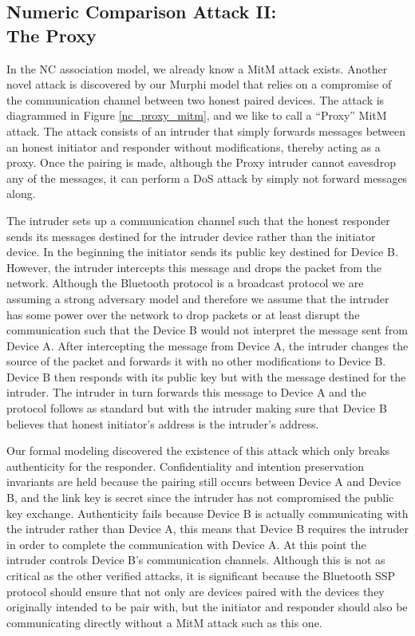 \documentclass{acm_proc_article-sp}
\begin{document}
\subsection{Numeric Comparison Attack II:\\The Proxy}
In the NC association model, we already know a MitM attack exists. Another novel attack is discovered by our Murphi model that relies on a compromise of the communication channel between two honest paired devices. The attack is diagrammed in Figure \ref{nc_proxy_mitm}, and we like to call a ``Proxy'' MitM attack. The attack consists of an intruder that simply forwards messages between an honest initiator and responder without modifications, thereby acting as a proxy. Once the pairing is made, although the Proxy intruder cannot eavesdrop any of the messages, it can perform a DoS attack by simply not forward messages along.

The intruder sets up a communication channel such that the honest responder sends its messages destined for the intruder device rather than the initiator device. In the beginning the initiator sends its public key destined for Device B. However, the intruder intercepts this message and drops the packet from the network. Although the Bluetooth protocol is a broadcast protocol we are assuming a strong adversary model and therefore we assume that the intruder has some power over the network to drop packets or at least disrupt the communication such that the Device B would not interpret the message sent from Device A. After intercepting the message from Device A, the intruder changes the source of the packet and forwards it with no other modifications to Device B. Device B then responds with its public key but with the message destined for the intruder. The intruder in turn forwards this message to Device A and the protocol follows as standard but with the intruder making sure that Device B believes that honest initiator's address is the intruder's address.

Our formal modeling discovered the existence of this attack which only breaks authenticity for the responder. Confidentiality and intention preservation invariants are held because the pairing still occurs between Device A and Device B, and the link key is secret since the intruder has not compromised the public key exchange. Authenticity fails because Device B is actually communicating with the intruder rather than Device A, this means that Device B requires the intruder in order to complete the communication with Device A. At this point the intruder controls Device B's communication channels. Although this is not as critical as the other verified attacks, it is significant because the Bluetooth SSP protocol should ensure that not only are devices paired with the devices they originally intended to be pair with, but the initiator and responder should also be communicating directly without a MitM attack such as this one.
\end{document}
